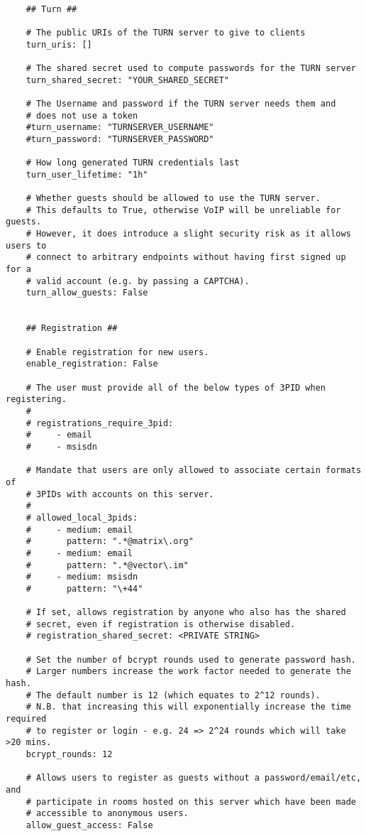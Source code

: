 \begin{lstlisting}
    
    ## Turn ##
    
    # The public URIs of the TURN server to give to clients
    turn_uris: []
    
    # The shared secret used to compute passwords for the TURN server
    turn_shared_secret: "YOUR_SHARED_SECRET"
    
    # The Username and password if the TURN server needs them and
    # does not use a token
    #turn_username: "TURNSERVER_USERNAME"
    #turn_password: "TURNSERVER_PASSWORD"
    
    # How long generated TURN credentials last
    turn_user_lifetime: "1h"
    
    # Whether guests should be allowed to use the TURN server.
    # This defaults to True, otherwise VoIP will be unreliable for guests.
    # However, it does introduce a slight security risk as it allows users to
    # connect to arbitrary endpoints without having first signed up for a
    # valid account (e.g. by passing a CAPTCHA).
    turn_allow_guests: False
    
    
    ## Registration ##
    
    # Enable registration for new users.
    enable_registration: False
    
    # The user must provide all of the below types of 3PID when registering.
    #
    # registrations_require_3pid:
    #     - email
    #     - msisdn
    
    # Mandate that users are only allowed to associate certain formats of
    # 3PIDs with accounts on this server.
    #
    # allowed_local_3pids:
    #     - medium: email
    #       pattern: ".*@matrix\.org"
    #     - medium: email
    #       pattern: ".*@vector\.im"
    #     - medium: msisdn
    #       pattern: "\+44"
    
    # If set, allows registration by anyone who also has the shared
    # secret, even if registration is otherwise disabled.
    # registration_shared_secret: <PRIVATE STRING>
    
    # Set the number of bcrypt rounds used to generate password hash.
    # Larger numbers increase the work factor needed to generate the hash.
    # The default number is 12 (which equates to 2^12 rounds).
    # N.B. that increasing this will exponentially increase the time required
    # to register or login - e.g. 24 => 2^24 rounds which will take >20 mins.
    bcrypt_rounds: 12
    
    # Allows users to register as guests without a password/email/etc, and
    # participate in rooms hosted on this server which have been made
    # accessible to anonymous users.
    allow_guest_access: False
    

\end{lstlisting}
